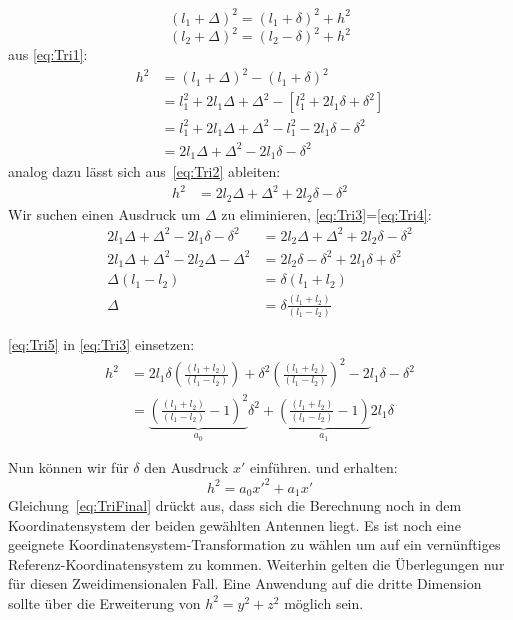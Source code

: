 \begin{appendix}
\begin{equation}\label{eq:Tri1}
(l_1+\Delta)^2 = (l_1+\delta)^2+h^2
\end{equation}
\begin{equation}\label{eq:Tri2}
(l_2+\Delta)^2 = (l_2-\delta)^2+h^2
\end{equation}
%
aus \eqref{eq:Tri1}:
\begin{align}
h^2 &= (l_1+\Delta)^2 - (l_1+\delta)^2\\
	&= l_1^2 + 2l_1\Delta + \Delta^2 -[ l_1^2 + 2 l_1 \delta + \delta^2]\nonumber\\
	&= l_1^2 + 2l_1\Delta + \Delta^2 - l_1^2 - 2 l_1 \delta - \delta^2	\nonumber\\
	&= 2l_1\Delta + \Delta^2 - 2 l_1 \delta - \delta^2 \label{eq:Tri3}
\end{align}
%
analog dazu lässt sich aus~\eqref{eq:Tri2} ableiten:
%
\begin{align}
h^2 &= 2l_2\Delta + \Delta^2 + 2 l_2 \delta - \delta^2 \label{eq:Tri4}
\end{align}
%
Wir suchen einen Ausdruck um $\Delta$ zu eliminieren, \eqref{eq:Tri3}=\eqref{eq:Tri4}:
%
\begin{align}
	2l_1\Delta + \Delta^2 - 2 l_1 \delta - \delta^2 &=  2l_2\Delta + \Delta^2 + 2 l_2 \delta - \delta^2 \nonumber \\
	2l_1\Delta + \Delta^2 - 2l_2\Delta - \Delta^2&= 2 l_2 \delta - \delta^2 +2l_1\delta +\delta^2 \nonumber \\
	\Delta(l_1 - l_2  ) &= \delta (l_1+l_2) \nonumber \\
	\Delta &= \delta\frac{(l_1 + l_2)}{(l_1 - l_2)} \label{eq:Tri5}
\end{align}

\eqref{eq:Tri5} in \eqref{eq:Tri3} einsetzen:
\begin{align}
	h^2 &= 2l_1\delta\left(\frac{(l_1 + l_2)}{(l_1 - l_2)}\right) + \delta^2\left(\frac{(l_1 + l_2)}{(l_1 - l_2)}\right)^2 - 2l_1 \delta - \delta^2 \nonumber \\
	&= \underbrace{\left(\frac{(l_1 + l_2)}{(l_1 - l_2)} - 1 \right)^2}_\text{$a_0$} \delta^2 + \underbrace{\left(\frac{(l_1 + l_2)}{(l_1 - l_2)}  - 1 \right)}_\text{$a_1$} 2l_1\delta
\end{align}

Nun können wir für $\delta$ den Ausdruck $x'$ einführen. und erhalten:
\begin{equation}
	h^2 = a_0 x'^2 + a_1 x' \label{eq:TriFinal}
\end{equation}
%
Gleichung~\eqref{eq:TriFinal} drückt aus, dass sich die Berechnung noch in dem Koordinatensystem der beiden gewählten Antennen liegt. Es ist noch eine geeignete Koordinatensystem-Transformation zu wählen um auf ein vernünftiges Referenz-Koordinatensystem zu kommen.
Weiterhin gelten die Überlegungen nur für diesen Zweidimensionalen Fall. Eine Anwendung auf die dritte Dimension sollte über die Erweiterung von $h^2 = y^2+z^2$ möglich sein.

\end{appendix}
